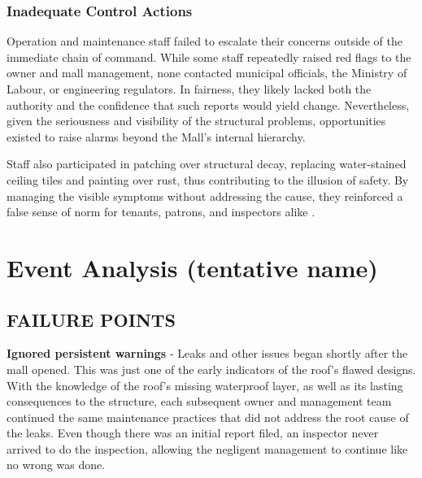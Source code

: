 \documentclass[12pt]{article}
\begin{document}
\subsubsection*{Inadequate Control Actions}

Operation and maintenance staff failed to escalate their concerns outside of the immediate chain of command. While some staff repeatedly raised red flags to the owner and mall management, none contacted municipal officials, the Ministry of Labour, or engineering regulators. In fairness, they likely lacked both the authority and the confidence that such reports would yield change. Nevertheless, given the seriousness and visibility of the structural problems, opportunities existed to raise alarms beyond the Mall’s internal hierarchy.

Staff also participated in patching over structural decay, replacing water-stained ceiling tiles and painting over rust, thus contributing to the illusion of safety. By managing the visible symptoms without addressing the cause, they reinforced a false sense of norm for tenants, patrons, and inspectors alike \cite[243]{AlgoLakeReport1}.

\section{Event Analysis (tentative name)} %




\subsection{FAILURE POINTS}

\textbf{Ignored persistent warnings} - Leaks and other issues began shortly after the mall opened. This was just one of the early indicators of the roof's flawed designs. With the knowledge of the roof's missing waterproof layer, as well as its lasting consequences to the structure, each subsequent owner and management team continued the same maintenance practices that did not address the root cause of the leaks. Even though there was an initial report filed, an inspector never arrived to do the inspection, allowing the negligent management to continue like no wrong was done.
 
\end{document}
